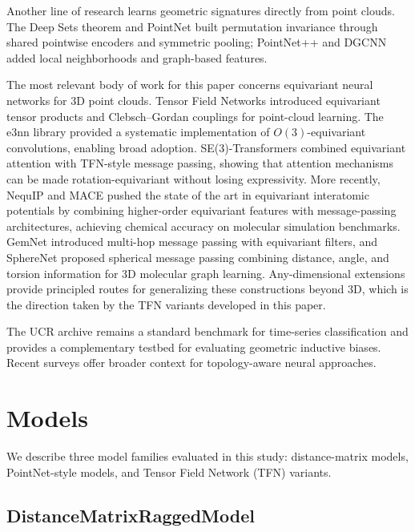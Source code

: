 \documentclass[a4paper,11pt]{article}
\begin{document}
Another line of research learns geometric signatures directly from point clouds.
The Deep Sets theorem \cite{deepsets2017} and PointNet \cite{pointnet2017} built permutation invariance through shared pointwise encoders and symmetric pooling; PointNet++ \cite{pointnetpp2017} and DGCNN \cite{dgcnn2018} added local neighborhoods and graph-based features.

The most relevant body of work for this paper concerns equivariant neural networks for 3D point clouds.
Tensor Field Networks \cite{tfn2018} introduced equivariant tensor products and Clebsch--Gordan couplings for point-cloud learning.
The e3nn library \cite{e3nn2022} provided a systematic implementation of $O(3)$-equivariant convolutions, enabling broad adoption.
SE(3)-Transformers \cite{se3transformers2020} combined equivariant attention with TFN-style message passing, showing that attention mechanisms can be made rotation-equivariant without losing expressivity.
More recently, NequIP \cite{nequip2022} and MACE \cite{mace2022} pushed the state of the art in equivariant interatomic potentials by combining higher-order equivariant features with message-passing architectures, achieving chemical accuracy on molecular simulation benchmarks.
GemNet \cite{gemnet2021} introduced multi-hop message passing with equivariant filters, and SphereNet \cite{spherenet2023} proposed spherical message passing combining distance, angle, and torsion information for 3D molecular graph learning.
Any-dimensional extensions \cite{anydim2024} provide principled routes for generalizing these constructions beyond 3D, which is the direction taken by the TFN variants developed in this paper.

The UCR archive \cite{ucr2019} remains a standard benchmark for time-series classification and provides a complementary testbed for evaluating geometric inductive biases.
Recent surveys \cite{hensel2021survey,moor2020topoae} offer broader context for topology-aware neural approaches.

\section{Models}
\label{sec:models}

We describe three model families evaluated in this study: distance-matrix models, PointNet-style models, and Tensor Field Network (TFN) variants.

\subsection{DistanceMatrixRaggedModel}
\end{document}
